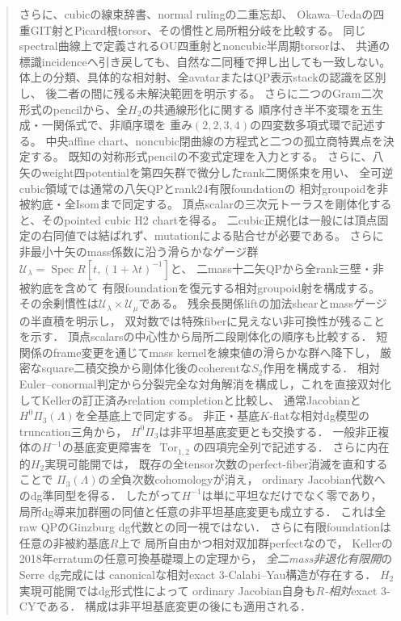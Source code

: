 \documentclass[a4paper,11pt]{ltjsarticle}
\numberwithin{equation}{section}
\theoremstyle{plain}
\theoremstyle{definition}
\theoremstyle{remark}
\DeclareMathOperator{\Spec}{Spec}
\begin{document}
\begin{abstract}
さらに、cubicの線束辞書、normal rulingの二重忘却、
Okawa--Uedaの四重GIT射とPicard根torsor、その慣性と局所粗分岐を比較する。
同じspectral曲線上で定義されるOU四重射とnoncubic半周期torsorは、
共通の標識incidenceへ引き戻しても、自然な二同種で押し出しても一致しない。
体上の分類、具体的な相対射、全avatarまたはQP表示stackの認識を区別し、
後二者の間に残る未解決範囲を明示する。
さらに二つのGram二次形式のpencilから、全$H_2$の共通線形化に関する
順序付き半不変環を五生成・一関係式で、非順序環を
重み$(2,2,3,4)$の四変数多項式環で記述する。
中央affine chart、noncubic閉曲線の方程式と二つの孤立商特異点を決定する。
既知の対称形式pencilの不変式定理を入力とする。
さらに、八矢のweight四potentialを第四矢群で微分したrank二関係束を用い、
全可逆cubic領域では通常の八矢QPとrank24有限foundationの
相対groupoidを非被約底・全Isomまで同定する。
頂点scalarの三次元トーラスを剛体化すると、そのpointed cubic H2 chartを得る。
二cubic正規化は一般には頂点固定の右同値では結ばれず、mutationによる貼合せが必要である。
さらに非最小十矢のmass係数に沿う滑らかなゲージ群
$\mathcal U_\lambda=\Spec R[t,(1+\lambda t)^{-1}]$と、
二mass十二矢QPから全rank三壁・非被約底を含めて
有限foundationを復元する相対groupoid射を構成する。
その余剰慣性は$\mathcal U_\lambda\times\mathcal U_\mu$である。
残余長関係liftの加法shearとmassゲージの半直積を明示し，
双対数では特殊fiberに見えない非可換性が残ることを示す．
頂点scalarsの中心性から局所二段剛体化の順序も比較する．
短関係のframe変更を通じてmass kernelを線束値の滑らかな群へ降下し，
厳密なsquare二積交換から剛体化後のcoherentな$S_2$作用を構成する．
相対Euler--conormal判定から分裂完全な対角解消を構成し，これを直接双対化してKellerの訂正済みrelation completionと比較し、
通常Jacobianと$H^0\Pi_3(\Lambda)$を全基底上で同定する。
非正・基底$K$-flatな相対dg模型のtruncation三角から，
$H^0\Pi_3$は非平坦基底変更とも交換する．
一般非正複体の$H^{-1}$の基底変更障害を
$\operatorname{Tor}_{1,2}$の四項完全列で記述する．
さらに内在的$H_2$実現可能開では，
既存の全tensor次数のperfect-fiber消滅を直和することで
$\Pi_3(\Lambda)$の\emph{全}負次数cohomologyが消え，
ordinary Jacobian代数へのdg準同型を得る．
したがって$H^{-1}$は単に平坦なだけでなく零であり，
局所dg導来加群圏の同値と任意の非平坦基底変更も成立する．
これは全raw QPのGinzburg dg代数との同一視ではない．
さらに有限foundationは任意の非被約基底$R$上で
局所自由かつ相対双加群perfectなので，
Kellerの2018年erratumの任意可換基礎環上の定理から，
\emph{全二mass非退化有限開}のSerre dg完成には
canonicalな相対exact $3$-Calabi--Yau構造が存在する．
$H_2$実現可能開ではdg形式性によって
ordinary Jacobian自身も\emph{$R$-相対}exact $3$-CYである．
構成は非平坦基底変更の後にも適用される．

\end{abstract}
\end{document}
